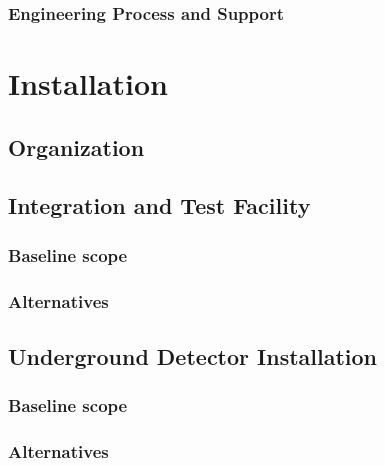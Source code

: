 \subsubsection{Engineering Process and Support}
\label{sec:fddp-coord-integ-engr-proc}
 
  
\section{Installation}
\label{sec:fddp-coord-install}

\subsection{Organization}
\label{sec:fddp-coord-org}


\subsection{Integration and Test Facility}
\label{sec:fddp-coord-integ-test}

\subsubsection{Baseline scope}
\label{sec:fddp-coord-integ-test-base}

\subsubsection{Alternatives}
\label{sec:fddp-coord-integ-test-alt}



\subsection{Underground Detector Installation}
\label{sec:fddp-coord-undergd}


\subsubsection{Baseline scope}
\label{sec:fddp-coord-undergd-base}


\subsubsection{Alternatives}
\label{sec:fddp-coord-undergd-alt}

